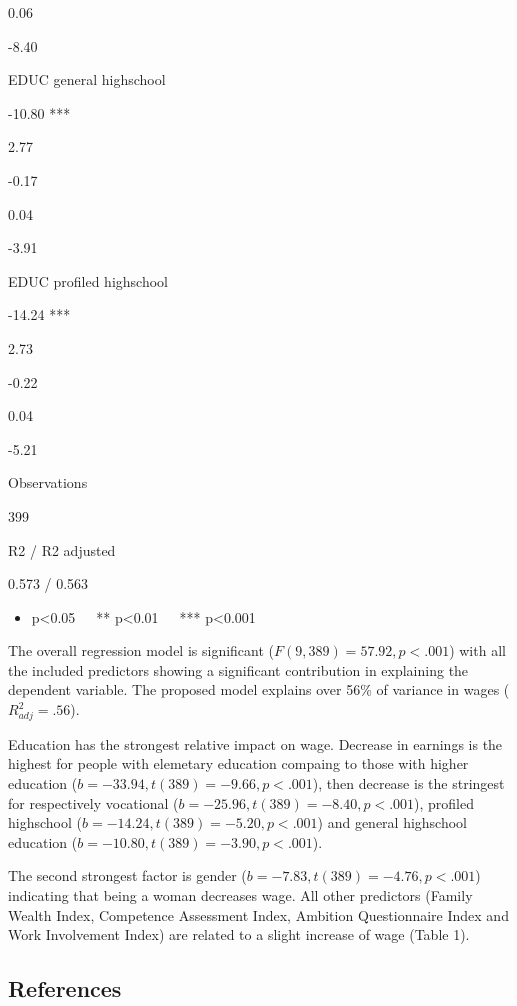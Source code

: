 \documentclass[]{article}
\providecommand{\tightlist}{%
  \setlength{\itemsep}{0pt}\setlength{\parskip}{0pt}}
\begin{document}
0.06

-8.40

EDUC general highschool

-10.80 ***

2.77

-0.17

0.04

-3.91

EDUC profiled highschool

-14.24 ***

2.73

-0.22

0.04

-5.21

Observations

399

R2 / R2 adjusted

0.573 / 0.563

\begin{itemize}
\tightlist
\item
  p\textless{}0.05~~~** p\textless{}0.01~~~*** p\textless{}0.001
\end{itemize}

The overall regression model is significant
(\(F(9, 389) = 57.92, p < .001\)) with all the included predictors
showing a significant contribution in explaining the dependent variable.
The proposed model explains over 56\% of variance in wages
(\(R^2_{adj} = .56\)).

Education has the strongest relative impact on wage. Decrease in
earnings is the highest for people with elemetary education compaing to
those with higher education (\(b = -33.94, t(389) = -9.66, p < .001\)),
then decrease is the stringest for respectively vocational
(\(b = -25.96, t(389) = -8.40, p < .001\)), profiled highschool
(\(b = -14.24, t(389) = -5.20, p < .001\)) and general highschool
education (\(b = -10.80, t(389) = -3.90, p < .001\)).

The second strongest factor is gender
(\(b = -7.83, t(389) = -4.76, p < .001\)) indicating that being a woman
decreases wage. All other predictors (Family Wealth Index, Competence
Assessment Index, Ambition Questionnaire Index and Work Involvement
Index) are related to a slight increase of wage (Table 1).

\hypertarget{references}{%
\subsection{References}\label{references}}
\end{document}
